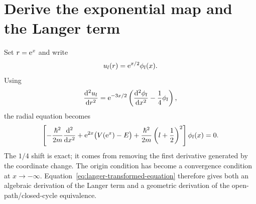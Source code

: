 \section{Derive the exponential map and the Langer term}
\label{app:langer-map}

Set $r=\mathrm{e}^x$ and write
\begin{equation}
  u_l(r)=\mathrm{e}^{x/2}\phi_l(x) .
  \label{eq:langer-wave-map}
\end{equation}
Using
\begin{equation}
  \frac{\mathrm{d}^2u_l}{\mathrm{d} r^2}
  =\mathrm{e}^{-3x/2}
  \left(\frac{\mathrm{d}^2\phi_l}{\mathrm{d} x^2}
  -\frac{1}{4}\phi_l\right),
  \label{eq:langer-derivative}
\end{equation}
the radial equation becomes
\begin{equation}
  \left[
  -\frac{\hbar^2}{2m}\frac{\mathrm{d}^2}{\mathrm{d} x^2}
  +\mathrm{e}^{2x}\bigl(V(\mathrm{e}^x)-E\bigr)
  +\frac{\hbar^2}{2m}
  \left(l+\frac{1}{2}\right)^2
  \right]\phi_l(x)=0 .
  \label{eq:langer-transformed-equation}
\end{equation}
The $1/4$ shift is exact; it comes from removing the first derivative generated
by the coordinate change.  The origin condition has become a convergence
condition at $x\to-\infty$.  Equation~\eqref{eq:langer-transformed-equation}
therefore gives both an algebraic derivation of the Langer term and a geometric
derivation of the open-path/closed-cycle equivalence.

